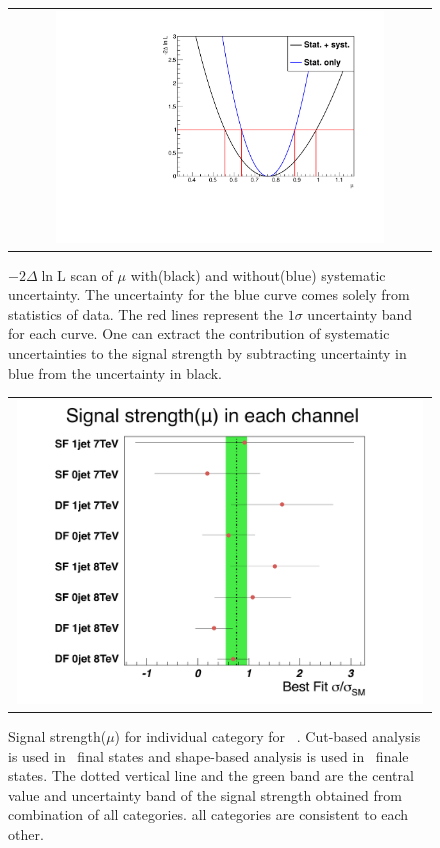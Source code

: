 %
\begin{figure}[htp] 
\centering 
\begin{tabular}{c} 
\includegraphics[width=0.8\textwidth]{figures/MuDeltaNLL.pdf}
\end{tabular} 
\caption{ $- 2\Delta\ln \textrm{L}$ scan of $\mu$ with(black) 
and without(blue) systematic uncertainty.
The uncertainty for the blue curve comes solely from statistics of data.
The red lines represent the $1\sigma$ uncertainty band for each curve. 
One can extract the contribution of systematic uncertainties to the signal strength
by subtracting uncertainty in blue from the uncertainty in black.} 
\label{fig:mu_scan} 
\end{figure} 

%
\begin{figure}[htp] 
\centering 
\begin{tabular}{c} 
\includegraphics[width=0.99\textwidth]{figures/mu_allchannels.pdf}
\end{tabular} 
\caption{ Signal strength($\mu$) for individual category for ~\GeV.
Cut-based analysis is used in \SF\ final states 
and shape-based analysis is used in \DF\ finale states. 
The dotted vertical line and the green band are 
the central value and uncertainty band of the signal strength 
obtained from combination of all categories. 
all categories are consistent to each other.
} 
\label{fig:mu_allchannels} 
\end{figure} 

